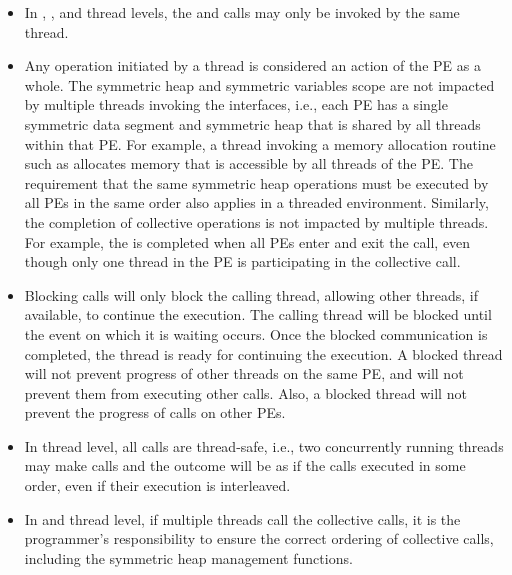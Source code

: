 \begin{itemize}
\item
In , , and  thread
levels, the  and  calls may only be invoked by the same thread.

\item
Any \openshmem{} operation initiated by a thread is considered an action of the \ac{PE} as a whole.
The symmetric heap and symmetric variables scope
are not impacted by multiple threads invoking the
\openshmem{} interfaces, i.e., 
each \ac{PE} has a single symmetric data segment and symmetric heap that is shared by
all threads within that \ac{PE}.  For example, a thread invoking a memory allocation
routine such as  
allocates memory that is accessible by all threads of the \ac{PE}. 
The requirement that the same symmetric heap operations must
be executed by all \acp{PE} in the same order also applies in a threaded
environment. Similarly, the completion of collective operations is not impacted by multiple threads. 
For example, the  is completed when all \acp{PE} enter and
exit the  call, even though only one thread in the \ac{PE} is
participating in the collective call. 


\item Blocking \openshmem{} calls will only block the calling thread, allowing
other threads, if available, to continue the execution. The calling thread will be blocked until the
event on which it is waiting occurs. Once the blocked communication is
completed, the thread is ready for continuing the execution. A blocked thread
will not prevent progress of other threads on the same \ac{PE}, and will not
prevent them from executing other \openshmem{} calls. Also, a blocked thread
will not prevent the progress of \openshmem{} calls on other \acp{PE}. 

\item In  thread level, all \openshmem{} calls are thread-safe, 
i.e., two concurrently running threads may make \openshmem{} calls and the outcome will be as if the calls executed in
some order, even if their execution is interleaved.

\item In  and  thread level, 
if multiple threads call the collective calls, it is the programmer's responsibility to ensure the correct ordering of
collective calls, including the symmetric heap management functions.

\end{itemize} 
